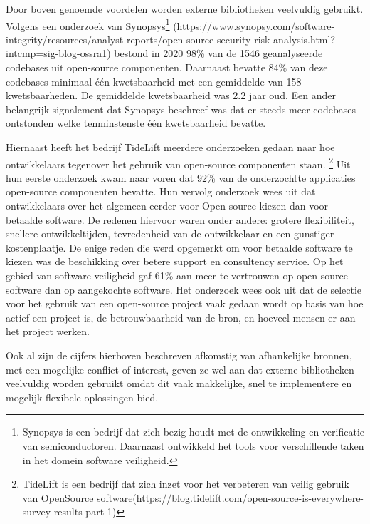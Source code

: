 Door boven genoemde voordelen worden externe bibliotheken veelvuldig gebruikt. Volgens een onderzoek van Synopsys\footnote{Synopsys is een bedrijf dat zich bezig houdt met de ontwikkeling en verificatie van semiconductoren. Daarnaast ontwikkeld het tools voor verschillende taken in het domein software veiligheid.} (https://www.synopsy.com/software-integrity/resources/analyst-reports/open-source-security-risk-analysis.html?intcmp=sig-blog-ossra1) bestond in 2020 98\% van de 1546 geanalyseerde codebases uit open-source componenten. Daarnaast bevatte 84\% van deze codebases minimaal één kwetsbaarheid met een gemiddelde van 158 kwetsbaarheden. De gemiddelde kwetsbaarheid was 2.2 jaar oud. Een ander belangrijk signalement dat Synopsys beschreef was dat er steeds meer codebases ontstonden welke tenminstenste één kwetsbaarheid bevatte.

Hiernaast heeft het bedrijf TideLift meerdere onderzoeken gedaan naar hoe ontwikkelaars tegenover het gebruik van open-source componenten staan.
\footnote{TideLift is een bedrijf dat zich inzet voor het verbeteren van veilig gebruik van OpenSource software(https://blog.tidelift.com/open-source-is-everywhere-survey-results-part-1)}
Uit hun eerste onderzoek kwam naar voren dat 92\% van de onderzochtte applicaties open-source componenten bevatte.
Hun vervolg onderzoek wees uit dat ontwikkelaars over het algemeen eerder voor Open-source kiezen dan voor betaalde software. De redenen hiervoor waren onder andere: grotere flexibiliteit, snellere ontwikkeltijden, tevredenheid van de ontwikkelaar en een gunstiger kostenplaatje. De enige reden die werd opgemerkt om voor betaalde software te kiezen was de beschikking over betere support en consultency service. Op het gebied van software veiligheid gaf 61\% aan meer te vertrouwen op open-source software dan op aangekochte software.
Het onderzoek wees ook uit dat de selectie voor het gebruik van een open-source project vaak gedaan wordt op basis van hoe actief een project is, de betrouwbaarheid van de bron, en hoeveel mensen er aan het project werken.

Ook al zijn de cijfers hierboven beschreven afkomstig van afhankelijke bronnen, met een mogelijke conflict of interest, geven ze wel aan dat externe bibliotheken veelvuldig worden gebruikt omdat dit vaak makkelijke, snel te implementere en mogelijk flexibele oplossingen bied.
%

